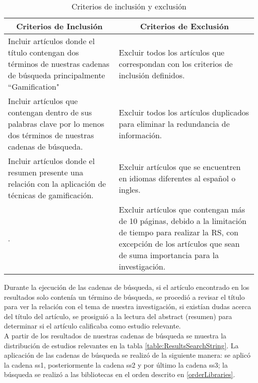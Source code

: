 \documentclass[•]{article}
\begin{document}
\begin{table}
    \begin{center}
        \caption{Criterios de inclusión y exclusión}
        \label{table:criterios}
        \begin{tabular}{| p{3.8cm} | p{3.8cm} |}
            \toprule
            \hline
            \multicolumn{1}{|c|}{\textbf{Criterios de Inclusión}} & \multicolumn{1}{|c|}{\textbf{Criterios de Exclusión}} \\
            \hline
            Incluir artículos donde el título contengan dos términos de nuestras cadenas de búsqueda principalmente ``Gamification"{ }& Excluir todos los artículos que correspondan con los criterios de inclusión definidos.\\
            \hline
            Incluir artículos que contengan dentro de sus palabras clave por lo menos dos términos de nuestras cadenas de búsqueda. & Excluir todos los artículos duplicados para eliminar la redundancia de información.\\
            \hline
            Incluir artículos donde el resumen presente una relación con la aplicación de técnicas de gamificación. & Excluir artículos que se encuentren en idiomas diferentes al español o ingles.\\
            \hline
            . & Excluir artículos que contengan más de 10 páginas, debido a la limitación de tiempo para realizar la RS, con excepción de los artículos que sean de suma importancia para la investigación.\\
            \hline
        \end{tabular}
    \end{center}
\end{table}

    Durante la ejecución de las cadenas de búsqueda, si el artículo encontrado en los resultados solo contenía un término de búsqueda, se procedió a revisar el título para ver la relación con el tema de nuestra investigación, si existían dudas acerca del título del artículo, se prosiguió a la lectura del abstract (resumen) para determinar si el artículo calificaba como estudio relevante. 
    \\
    A partir de los resultados de nuestras cadenas de búsqueda se muestra la distribución de estudios relevantes en la tabla \ref{table:ResultsSearchString}. La aplicación de las cadenas de búsqueda se realizó de la siguiente manera: se aplicó la cadena ss1, posteriormente la cadena ss2 y por último la cadena ss3; la búsqueda se realizó a las bibliotecas en el orden descrito en \ref{orderLibraries}.
    
\end{document}
